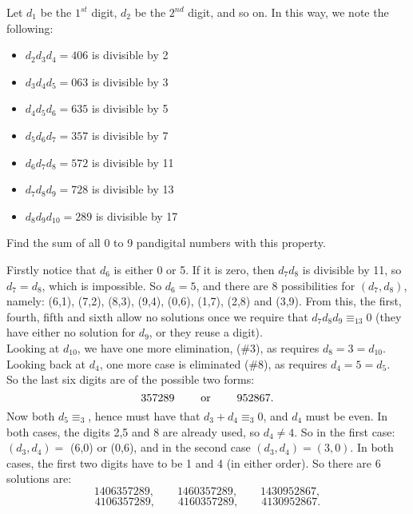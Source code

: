 Let $d_1$ be the $1^{st}$ digit, $d_2$ be the $2^{nd}$ digit, and so on. In this way, we note the following:
\begin{itemize}                             \vspace{-0.3cm}
\item $d_2d_3d_4=406$ is divisible by 2     \vspace{-0.3cm}
\item $d_3d_4d_5=063$ is divisible by 3     \vspace{-0.3cm}
\item $d_4d_5d_6=635$ is divisible by 5     \vspace{-0.3cm}
\item $d_5d_6d_7=357$ is divisible by 7     \vspace{-0.3cm}
\item $d_6d_7d_8=572$ is divisible by 11    \vspace{-0.3cm}
\item $d_7d_8d_9=728$ is divisible by 13    \vspace{-0.3cm}
\item $d_8d_9d_{10}=289$ is divisible by 17 \vspace{-0.3cm}
\end{itemize}                   

Find the sum of all 0 to 9 pandigital numbers with this property.

Firstly notice that $d_6$ is either 0 or 5.  If it is zero, then $d_7d_8$ is divisible by 11, so $d_7 = d_8$, which
is impossible.  So $d_6 = 5$, and there are 8 possibilities for $(d_7, d_8)$, namely:
(6,1), (7,2), (8,3), (9,4), (0,6), (1,7), (2,8) and (3,9).   From this, 
the first, fourth, fifth and sixth allow no solutions once we require that $d_7d_8d_9 \equiv_{13} 0$ (they 
have either no solution for $d_9$, or they reuse a digit).  \\
Looking at $d_{10}$, we have  one more elimination, (\#3), as  requires $d_8 = 3 = d_{10}$. \\
Looking back at $d_4$, one more case is eliminated (\#8), as  requires $d_4 = 5 = d_5$. \\
So the last six digits are of the possible two forms:
$$ 357289 \qquad \hbox{ or } \qquad 952867.$$
Now both $d_5 \equiv_3 $, hence must have that $d_3+d_4 \equiv_3 0$, and $d_4$ must be even.  
In both cases, the digits 2,5 and 8 are already used, so $d_4 \neq 4$.  So in the first case:
$(d_3, d_4) = $ (6,0) or (0,6), and in the second case $(d_3,d_4) = (3,0)$.  In both cases, 
the first two digits have to be 1 and 4 (in either order).  So there are 6 solutions are: 
$$ 1406357289, \qquad 1460357289, \qquad 1430952867,$$      \vspace{-0.5cm}
$$ 4106357289, \qquad 4160357289, \qquad 4130952867.$$

